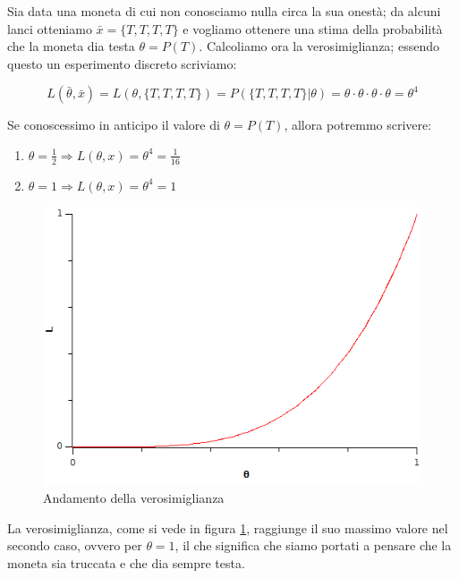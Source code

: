\begin{esempio} %
Sia data una moneta di cui non conosciamo nulla circa la sua onestà; da alcuni lanci otteniamo $\bar{x}=\{T,T,T,T\}$ e vogliamo ottenere una stima della probabilità che la moneta dia testa $\theta=P(T)$. Calcoliamo ora la verosimiglianza; essendo questo un esperimento discreto scriviamo:

    \[ L(\bar{\theta},\bar{x})=L(\theta,\{T,T,T,T\})=P(\{T,T,T,T\}|\theta)=\theta \cdot \theta \cdot \theta \cdot \theta = \theta^4 \]

Se conoscessimo in anticipo il valore di $\theta=P(T)$, allora potremmo scrivere:

\begin{enumerate}
  \item $\theta=\frac{1}{2}  \Rightarrow L(\theta,x)=\theta^4=\frac{1}{16}$
  \item $\theta=1  \Rightarrow L(\theta,x)=\theta^4=1$
\end{enumerate}

  \begin{figure}[htbp]
      \centering
      \includegraphics[scale=0.5]{img/verosim.png}
      \caption{Andamento della verosimiglianza\label{fig:verosim1}}
  \end{figure}

La verosimiglianza, come si vede in figura \ref{fig:verosim1}, raggiunge il suo massimo valore nel secondo caso, ovvero per $\theta=1$, il che significa che siamo portati a pensare che la moneta sia truccata e che dia sempre testa.
\end{esempio}

